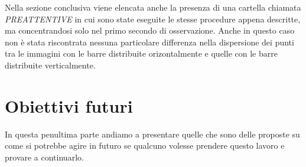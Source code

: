 \documentclass[%
	corpo=12pt,
    twoside,
    stile=classica,
    oldstyle,
    tipotesi=custom,
    greek,
    evenboxes,
]{toptesi}
\begin{document}
{Nella sezione conclusiva viene elencata anche la presenza di una cartella chiamata \textit{PREATTENTIVE} in cui sono state eseguite le stesse procedure appena descritte, ma concentrandosi solo nel primo secondo di osservazione. Anche in questo caso non è stata riscontrata nessuna particolare differenza nella dispersione dei punti tra le immagini con le barre distribuite orizontalmente e quelle con le barre distribuite verticalmente.




\section{Obiettivi futuri}

In questa penultima parte andiamo a presentare quelle che sono delle proposte su come si potrebbe agire in futuro se qualcuno volesse prendere questo lavoro e provare a continuarlo.

}
\end{document}
